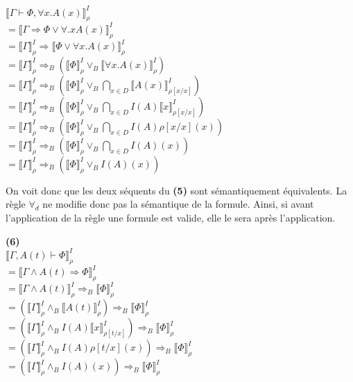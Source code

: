 \documentclass[11pt,letterpaper]{article}
\begin{document}
$\llbracket \Gamma \vdash \Phi,\forall x.A(x) \rrbracket^{I}_ {\rho}$\\
$= \llbracket \Gamma \Rightarrow \Phi \lor \forall.x A(x) \rrbracket^{I}_ {\rho}$\\
$= \llbracket \Gamma \rrbracket^{I}_ {\rho} \Rightarrow \llbracket \Phi \lor \forall x.A(x) \rrbracket^{I}_ {\rho}$\\
$= \llbracket \Gamma \rrbracket^{I}_ {\rho} \Rightarrow_{B} (\llbracket\Phi \rrbracket^{I}_ {\rho} \lor_{B} \llbracket \forall x.A(x) \rrbracket^{I}_ {\rho})$\\
$= \llbracket \Gamma \rrbracket^{I}_ {\rho} \Rightarrow_{B} (\llbracket\Phi \rrbracket^{I}_ {\rho} \lor_{B} \bigcap_{x \in D}\llbracket A(x) \rrbracket^{I}_ {\rho[x/x]})$\\
$= \llbracket \Gamma \rrbracket^{I}_ {\rho} \Rightarrow_{B} (\llbracket\Phi \rrbracket^{I}_ {\rho} \lor_{B} \bigcap_{x \in D} I(A) \llbracket x \rrbracket^{I}_ {\rho[x/x]})$\\
$= \llbracket \Gamma \rrbracket^{I}_ {\rho} \Rightarrow_{B} (\llbracket\Phi \rrbracket^{I}_ {\rho} \lor_{B} \bigcap_{x \in D} I(A)\rho[x/x](x))$\\
$= \llbracket \Gamma \rrbracket^{I}_ {\rho} \Rightarrow_{B} (\llbracket\Phi \rrbracket^{I}_ {\rho} \lor_{B} \bigcap_{x \in D} I(A)(x))$\\
$= \llbracket \Gamma \rrbracket^{I}_ {\rho} \Rightarrow_{B} (\llbracket\Phi \rrbracket^{I}_ {\rho} \lor_{B} I(A)(x))$\\

\vspace{10px}

On voit donc que les deux séquents du \textbf{(5)} sont sémantiquement équivalents. La règle $\forall_{d}$ ne modifie donc pas la sémantique de la formule. Ainsi, si avant l'application de la règle une formule est valide, elle le sera après l'application. \\

\vspace{10px}

\textbf{(6)}\\
$\llbracket \Gamma, A(t) \vdash \Phi \rrbracket^{I}_{\rho}$\\
$=\llbracket \Gamma \land A(t) \Rightarrow \Phi \rrbracket^{I}_{\rho}$\\
$=\llbracket \Gamma  \land A(t)\rrbracket^{I}_{\rho} \Rightarrow_{B} \llbracket \Phi \rrbracket^{I}_{\rho}$\\
$=(\llbracket \Gamma \rrbracket^{I}_{\rho} \land_{B} \llbracket A(t)\rrbracket^{I}_{\rho}) \Rightarrow_{B} \llbracket \Phi \rrbracket^{I}_{\rho}$\\
$=(\llbracket \Gamma \rrbracket^{I}_{\rho} \land_{B}  I (A) \llbracket x \rrbracket^{I}_{\rho[t/x]}) \Rightarrow_{B} \llbracket \Phi \rrbracket^{I}_{\rho}$\\
$=(\llbracket \Gamma \rrbracket^{I}_{\rho} \land_{B} I(A)\rho[t/x](x)) \Rightarrow_{B} \llbracket \Phi \rrbracket^{I}_{\rho}$\\
$=(\llbracket \Gamma \rrbracket^{I}_{\rho} \land_{B} I(A)(x)) \Rightarrow_{B} \llbracket \Phi \rrbracket^{I}_{\rho}$\\
\end{document}
